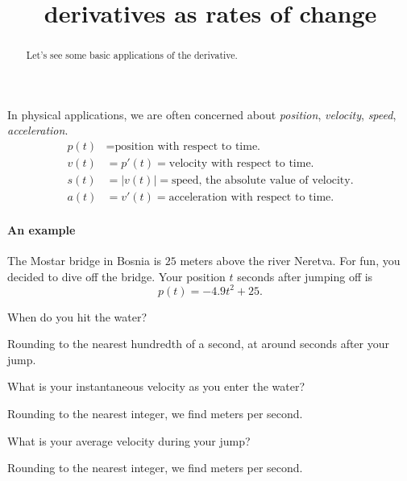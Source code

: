 \documentclass{ximera}
\title{derivatives as rates of change}
\begin{document}
\begin{abstract}
  Let's see some basic applications of the derivative.
\end{abstract}
\maketitle

In physical applications, we are often concerned about
\textit{position}, \textit{velocity}, \textit{speed},
\textit{acceleration}.
\begin{align*}
p(t) &= \text{position with respect to time.}\\
v(t) &= p'(t) = \text{velocity with respect to time.}\\
s(t) &= |v(t)| = \text{speed, the absolute value of velocity.}\\
a(t) &=v'(t) = \text{acceleration with respect to time.}
\end{align*}

\paragraph{An example}


The Mostar bridge in Bosnia is $25$ meters above the river
Neretva. For fun, you decided to dive off the bridge. Your position
$t$ seconds after jumping off is
\[
p(t) = -4.9t^2 + 25.
\]

\begin{question}
  When do you hit the water? 
  \begin{prompt}
    Rounding to the nearest hundredth of a second, at around
     seconds after your jump.
  \end{prompt}
\end{question}

\begin{question}
  What is your instantaneous velocity as you enter the water?
  \begin{prompt}
    Rounding to the nearest integer, we find  meters per second. 
  \end{prompt}
\end{question}


\begin{question}
  What is your average velocity during your jump?
  \begin{prompt}
    Rounding to the nearest integer, we find  meters per second. 
  \end{prompt}
\end{question}
\end{document}
